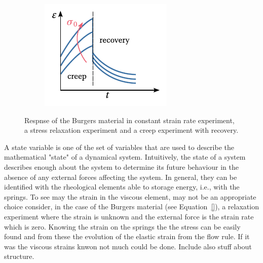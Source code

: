 \begin{figure}
\begin{subfigure}[b]{0.30\textwidth}
            \caption{}
            \label{subfig:burgers_stress_relax}
    \end{subfigure}
    \hfill
    \begin{subfigure}[b]{0.30\textwidth}
      \centering
      \includegraphics[width=\textwidth]{figures/burgers_creep_plus_recov}
      \caption{}
      \label{subfig:burgers_creep_plus_recov}
    \end{subfigure}
  \caption{Respnse of the Burgers material in  constant strain rate experiment,  a stress relaxation experiment and a  creep experiment with recovery.}
\label{fig:burgers_mat_res}
\end{figure}

\begin{remark}
  A state variable is one of the set of variables that are used to describe the mathematical "state" of a dynamical system. Intuitively, the state of a system describes enough about the system to determine its future behaviour in the absence of any external forces affecting the system.
  In general, they can be identified with the rheological elements able to storage energy, i.e., with the springs.
  To see may the strain in the viscous element, may not be an appropriate choice consider, in the case of the Burgers material (see Equation~\eqref{}), a relaxation experiment where the strain is unknown and the external force is the strain rate which is zero.
  Knowing the strain on the springs the the stress can be easily found and from these the evolution of the elastic strain from the flow rule.
  If it was the viscous strains knwon not much could be done.
  \colorbox{BurntOrange}{Include also stuff about structure.}
\end{remark}

